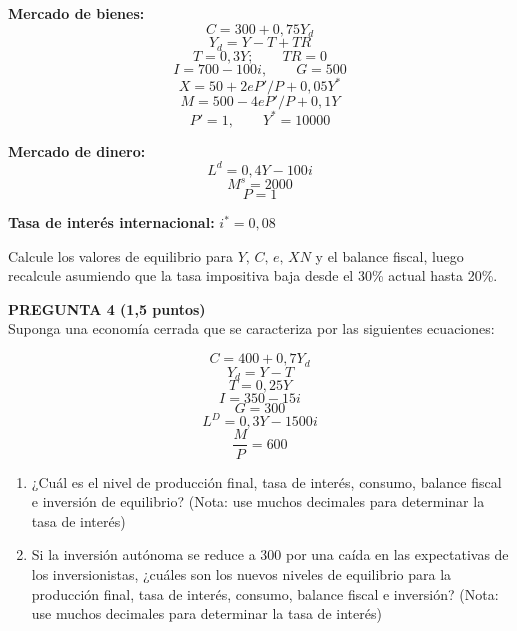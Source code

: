 \documentclass[11pt,addpoints]{article}
\begin{document}
\textbf{Mercado de bienes:}
\[
C = 300 + 0{,}75Y_d
\]
\[
Y_d = Y - T + TR
\]
\[
T = 0{,}3Y; \qquad TR = 0
\]
\[
I = 700 - 100i, \qquad G = 500
\]
\[
X = 50 + 2eP'/P + 0{,}05Y^*
\]
\[
M = 500 - 4eP'/P + 0{,}1Y
\]
\[
P' = 1, \qquad Y^* = 10000
\]

\newpage
\vspace*{0.5cm}
\textbf{Mercado de dinero:}
\[
L^d = 0{,}4Y - 100i
\]
\[
M^s = 2000
\]
\[
P = 1
\]

\textbf{Tasa de interés internacional:} \quad \( i^* = 0{,}08 \)

\vspace{0.3cm}
Calcule los valores de equilibrio para \( Y,\, C,\, e,\, XN \) y el balance fiscal, luego recalcule asumiendo que la tasa impositiva baja desde el 30\% actual hasta 20\%.

\vspace{1.5cm}

\textbf{PREGUNTA 4 (1,5 puntos)}\\[0.3cm]
Suponga una economía cerrada que se caracteriza por las siguientes ecuaciones:

\[
C = 400 + 0{,}7Y_d
\]
\[
Y_d = Y - T
\]
\[
T = 0{,}25Y
\]
\[
I = 350 - 15i
\]
\[
G = 300
\]
\[
L^D = 0{,}3Y - 1500i
\]
\[
\frac{M}{P} = 600
\]

\begin{enumerate}[label=\alph*)]
\item ¿Cuál es el nivel de producción final, tasa de interés, consumo, balance fiscal e inversión de equilibrio? (Nota: use muchos decimales para determinar la tasa de interés)

\item Si la inversión autónoma se reduce a 300 por una caída en las expectativas de los inversionistas, ¿cuáles son los nuevos niveles de equilibrio para la producción final, tasa de interés, consumo, balance fiscal e inversión? (Nota: use muchos decimales para determinar la tasa de interés)
\end{enumerate}
\end{document}
